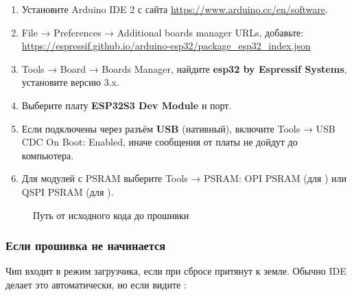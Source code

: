\begin{enumerate}
  \item Установите Arduino IDE 2 с сайта \url{https://www.arduino.cc/en/software}.
  \item \textsf{File → Preferences → Additional boards manager URLs}, добавьте:\\
    {\small\url{https://espressif.github.io/arduino-esp32/package_esp32_index.json}}
  \item \textsf{Tools → Board → Boards Manager}, найдите \textbf{esp32 by Espressif Systems},
        установите версию 3.x.
  \item Выберите плату \textbf{ESP32S3 Dev Module} и порт.
  \item Если подключены через разъём \textbf{USB} (нативный), включите \textsf{Tools → USB CDC On Boot: Enabled},
        иначе сообщения от платы не дойдут до компьютера.
  \item Для модулей с PSRAM выберите \textsf{Tools → PSRAM: OPI PSRAM} (для ) или \textsf{QSPI PSRAM} (для ).
\end{enumerate}

\begin{figure}[H]
\centering
{}
\caption{Путь от исходного кода до прошивки}
\end{figure}

\subsubsection{Если прошивка не начинается}

Чип входит в режим загрузчика, если при сбросе  притянут к земле. Обычно IDE делает это
автоматически, но если видите :

